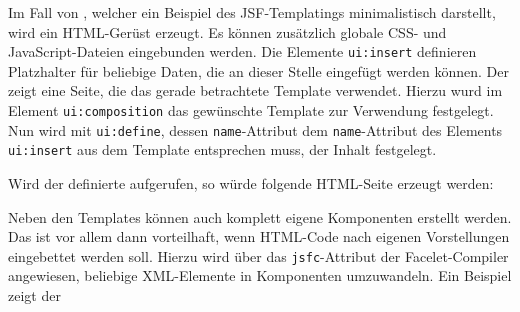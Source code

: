 Im Fall von , welcher ein Beispiel des JSF-Templatings minimalistisch darstellt, wird ein HTML-Gerüst erzeugt. Es können zusätzlich globale CSS- und JavaScript-Dateien eingebunden werden.
Die Elemente \texttt{ui:insert} definieren Platzhalter für beliebige Daten, die an dieser Stelle eingefügt werden können.
Der  zeigt eine Seite, die das gerade betrachtete Template verwendet.
Hierzu wurd im Element \texttt{ui:composition} das gewünschte Template zur Verwendung festgelegt. Nun wird mit \texttt{ui:define}, dessen \texttt{name}-Attribut dem \texttt{name}-Attribut des Elements \texttt{ui:insert} aus dem Template entsprechen muss, der Inhalt festgelegt.

	
	
Wird der definierte  aufgerufen, so würde folgende HTML-Seite erzeugt werden:

	


Neben den Templates können auch komplett eigene Komponenten erstellt werden. Das ist vor allem dann vorteilhaft, wenn HTML-Code nach eigenen Vorstellungen eingebettet werden soll.
Hierzu wird über das \texttt{jsfc}-Attribut der Facelet-Compiler angewiesen, beliebige XML-Elemente in Komponenten umzuwandeln. 
Ein Beispiel zeigt der 

	
	
